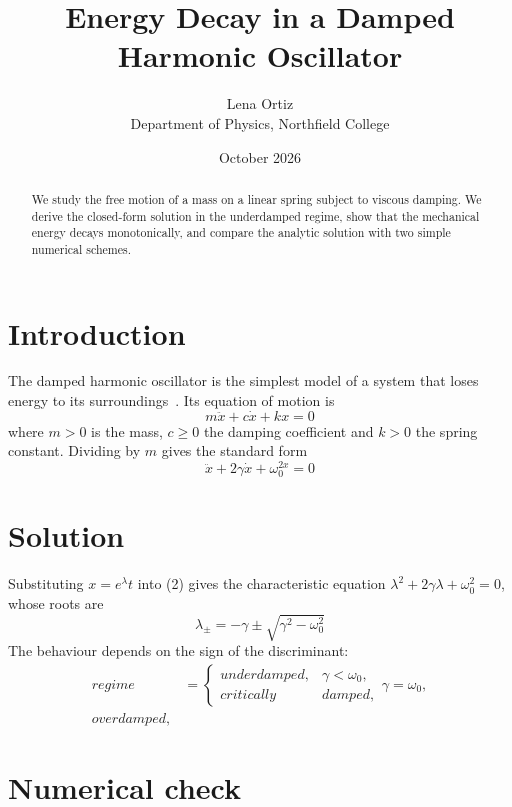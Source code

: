 \documentclass[11pt,a4paper]{article}
\title{Energy Decay in a Damped Harmonic Oscillator}
\author{Lena Ortiz\\ \small Department of Physics, Northfield College}
\date{October 2026}
\begin{document}
\maketitle

\begin{abstract}
We study the free motion of a mass on a linear spring subject to viscous damping. We derive the closed-form solution in the underdamped regime, show that the mechanical energy decays monotonically, and compare the analytic solution with two simple numerical schemes.
\end{abstract}

\section{Introduction}\label{sec:intro}

The damped harmonic oscillator is the simplest model of a system that loses energy to its surroundings~\cite{ref1}. Its equation of motion is
\begin{equation}
  m\ddot{x}+c\dot{x}+kx=0
\end{equation}
where $m>0$ is the mass, $c\geq0$ the damping coefficient and $k>0$ the spring constant. Dividing by $m$ gives the standard form
\begin{equation}
  \ddot{x}+2\gamma\dot{x}+\omega_{0}^{2x}=0
\end{equation}

\section{Solution}\label{sec:method}

Substituting $x=e^{\lambda}t$ into (2) gives the characteristic equation $\lambda^{2}+2\gamma\lambda+\omega_{0}^{2}=0$, whose roots are
\begin{equation}
  \lambda_{\pm}=-\gamma\pm\sqrt{\gamma^{2}-\omega_{0}^{2}}
\end{equation}
The behaviour depends on the sign of the discriminant:
\begin{align}
  regime &=\begin{cases}
underdamped, & \gamma<\omega_{0}, \\
critically & damped,
\end{cases}\gamma=\omega_{0}, \\
  overdamped,
\end{align}

\section{Numerical check}\label{sec:results}
\end{document}
